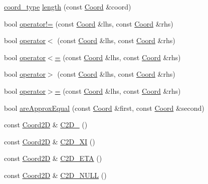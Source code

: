 \begin{DoxyCompactItemize}
\item 
\hyperlink{namespaceMcCAD_1_1Geometry_ac043b37a4a7e849fca22869e1982d2f8}{coord\+\_\+type} \hyperlink{namespaceMcCAD_1_1Geometry_ad2997914c766f1fc561cdd30032b6777}{length} (const \hyperlink{classMcCAD_1_1Geometry_1_1Coord}{Coord} \&coord)
\item 
bool \hyperlink{namespaceMcCAD_1_1Geometry_a3d4155a36e91bdfe1b6374182fe8a267}{operator!=} (const \hyperlink{classMcCAD_1_1Geometry_1_1Coord}{Coord} \&lhs, const \hyperlink{classMcCAD_1_1Geometry_1_1Coord}{Coord} \&rhs)
\item 
bool \hyperlink{namespaceMcCAD_1_1Geometry_a9472e1142568ff8bd1587356b40621a4}{operator$<$} (const \hyperlink{classMcCAD_1_1Geometry_1_1Coord}{Coord} \&lhs, const \hyperlink{classMcCAD_1_1Geometry_1_1Coord}{Coord} \&rhs)
\item 
bool \hyperlink{namespaceMcCAD_1_1Geometry_af6943ff2d52b3c0746ddaf398120e0c5}{operator$<$=} (const \hyperlink{classMcCAD_1_1Geometry_1_1Coord}{Coord} \&lhs, const \hyperlink{classMcCAD_1_1Geometry_1_1Coord}{Coord} \&rhs)
\item 
bool \hyperlink{namespaceMcCAD_1_1Geometry_ab21064b08087c86f76ba674ef7af932c}{operator$>$} (const \hyperlink{classMcCAD_1_1Geometry_1_1Coord}{Coord} \&lhs, const \hyperlink{classMcCAD_1_1Geometry_1_1Coord}{Coord} \&rhs)
\item 
bool \hyperlink{namespaceMcCAD_1_1Geometry_a903001ae7c418a4cfd2b5839b8a47d72}{operator$>$=} (const \hyperlink{classMcCAD_1_1Geometry_1_1Coord}{Coord} \&lhs, const \hyperlink{classMcCAD_1_1Geometry_1_1Coord}{Coord} \&rhs)
\item 
bool \hyperlink{namespaceMcCAD_1_1Geometry_acad920c663ce775977ff6dc46b1030af}{are\+Approx\+Equal} (const \hyperlink{classMcCAD_1_1Geometry_1_1Coord}{Coord} \&first, const \hyperlink{classMcCAD_1_1Geometry_1_1Coord}{Coord} \&second)
\item 
const \hyperlink{classMcCAD_1_1Geometry_1_1Coord2D}{Coord2D} \& \hyperlink{namespaceMcCAD_1_1Geometry_a1839f640b92275bf5245e918fa8a2137}{C2\+D\+\_} ()
\item 
const \hyperlink{classMcCAD_1_1Geometry_1_1Coord2D}{Coord2D} \& \hyperlink{namespaceMcCAD_1_1Geometry_aba63d6531c9162396c3012cdb1957a60}{C2\+D\+\_\+\+XI} ()
\item 
const \hyperlink{classMcCAD_1_1Geometry_1_1Coord2D}{Coord2D} \& \hyperlink{namespaceMcCAD_1_1Geometry_a31a700c18fb6302d53490b7744e1c57f}{C2\+D\+\_\+\+E\+TA} ()
\item 
const \hyperlink{classMcCAD_1_1Geometry_1_1Coord2D}{Coord2D} \& \hyperlink{namespaceMcCAD_1_1Geometry_a14ff5fd2db066e4dfad0a638f03762a2}{C2\+D\+\_\+\+N\+U\+LL} ()

\end{DoxyCompactItemize}
